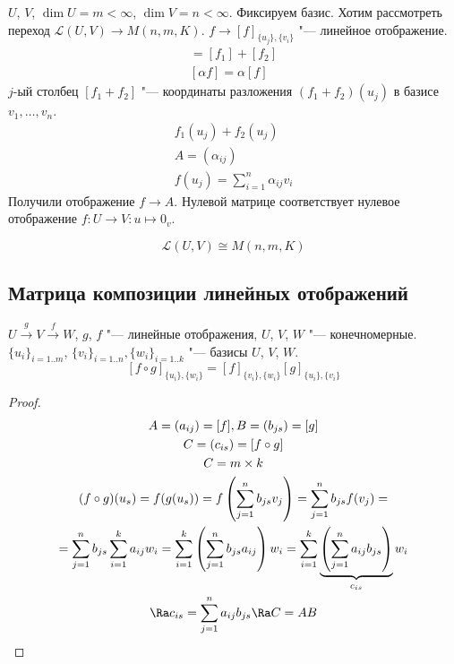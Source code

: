 $U$, $V$, $\dim U = m < \infty$, $\dim V = n < \infty$.
Фиксируем базис. Хотим рассмотреть переход $\mathcal{L}(U, V) \to M(n, m, K)$.
$f \to [f]_{\{u_j\}, \{v_i\}}$ "--- линейное отображение.
\begin{gather*}
	[f_1 + f_2] = [f_1] + [f_2] \\
	[\alpha f] = \alpha[f] 
\end{gather*}
$j$-ый столбец $[f_1 + f_2]$ "--- координаты разложения $(f_1 + f_2)(u_j)$ в базисе $v_1, \dots, v_n$.
\begin{gather*}
	f_1(u_j) + f_2(u_j) \\
	A = (\alpha_{ij}) \\
	f(u_j) = \sum_{i = 1}^n\alpha_{ij}v_i
\end{gather*}
Получили отображение $f \to A$.
Нулевой матрице соответствует нулевое отображение $f\colon U \to V\colon u \mapsto 0_v$.
\begin{conseq}
	\[ \mathcal{L}(U, V) \cong M(n, m, K) \]
\end{conseq}

\subsection{Матрица композиции линейных отображений}

\begin{theorem}
	$U \stackrel{g}{\to} V \stackrel{f}{\to}W$, $g$, $f$ "--- линейные отображения,
	$U$, $V$, $W$ "--- конечномерные.
	$\{u_i\}_{i=1..m}$, $\{v_i\}_{i=1..n}, \{w_i\}_{i = 1..k}$ "--- базисы $U$, $V$, $W$.
	\[ [f \circ g]_{\{u_i\}, \{w_i\}} = [f]_{\{v_i\}, \{w_i\}}[g]_{\{u_i\}, \{v_i\}} \]
\end{theorem}

\begin{proof}
	\begin{gather*}
		A = (a_{ij}) = [f], B = (b_{js}) = [g] \\
		C = (c_{is}) = [f \circ g] \\
		C = m \times k \\
		(f \circ g)(u_s) = f(g(u_s)) = f\left(\sum_{j = 1}^nb_{js}v_j\right) = \sum_{j = 1}^nb_{js}f(v_j) = \\
		= \sum_{j = 1}^nb_{js}\sum_{i = 1}^ka_{ij}w_i = \sum_{i = 1}^k\left(\sum_{j = 1}^nb_{js}a_{ij}\right) w_i
			= \sum_{i = 1}^k\underbrace{\left(\sum_{j = 1}^na_{ij}b_{js}\right)}_{c_{is}}w_i \\
		\Ra c_{is} = \sum_{j = 1}^na_{ij}b_{js} \Ra C = AB
	\end{gather*}
\end{proof}

